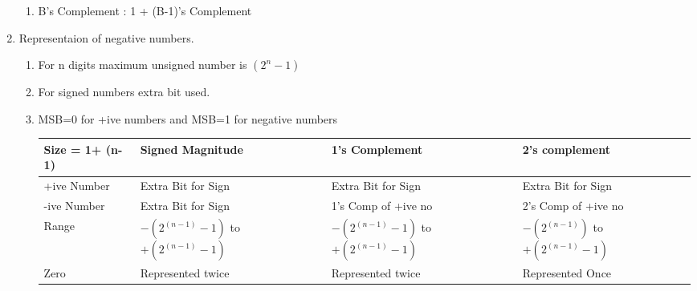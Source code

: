 \begin{enumerate}
\begin{minipage}{\linewidth}
\begin{enumerate}
        \item B's Complement : 1 + (B-1)'s Complement
    \end{enumerate}
    \end{minipage}


    \item Representaion of negative numbers.
    \begin{enumerate}
        \item For n digits maximum unsigned number is \( (2^n -1) \)
        \item For signed numbers extra bit used.
        \item MSB=0 for +ive numbers and MSB=1 for negative numbers \\
    \begin{myTableStyle} \begin{tabular}{ |m{3cm}|m{3cm}|m{3cm}|m{3cm}| } \hline
        Size = 1+ (n-1)     & Signed Magnitude           & 1's Complement       & 2's complement        \\ \hline
        +ive Number         & Extra Bit for Sign         & Extra Bit for Sign   & Extra Bit for Sign    \\ \hline
        -ive Number         & Extra Bit for Sign         & 1's Comp of +ive no  & 2's Comp of +ive no   \\ \hline
        Range               & \makecell[l]{ \( -(2^{(n-1)} -1) \) to \\ \( +(2^{(n-1)} -1) \) }
                                                         & \makecell[l]{ \( -(2^{(n-1)} -1) \) to \\ \( +(2^{(n-1)} -1) \) }
                                                         & \makecell[l]{ \( -(2^{(n-1)}) \) to \\ \( +(2^{(n-1)} -1) \) }   \\ \hline
        Zero                & Represented twice          & Represented twice    & Represented Once   \\ \hline
    \end{tabular} \end{myTableStyle} \vspace{0.08in}
    \end{enumerate}


\end{enumerate}
